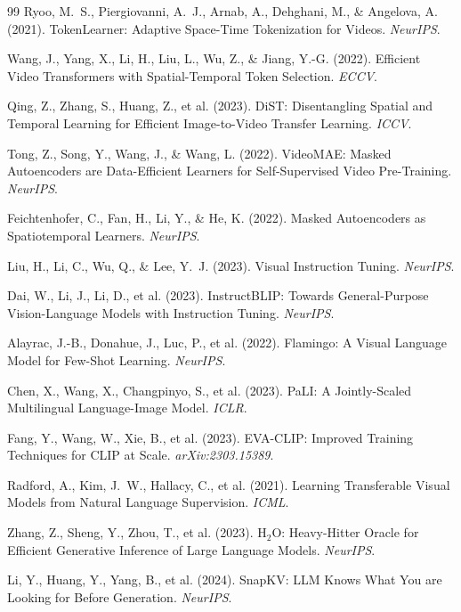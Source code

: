 \documentclass{article}
\begin{document}
{\begin{thebibliography}{99}
Ryoo, M.~S., Piergiovanni, A.~J., Arnab, A., Dehghani, M., \& Angelova, A. (2021). TokenLearner: Adaptive Space-Time Tokenization for Videos. \emph{NeurIPS}.

Wang, J., Yang, X., Li, H., Liu, L., Wu, Z., \& Jiang, Y.-G. (2022). Efficient Video Transformers with Spatial-Temporal Token Selection. \emph{ECCV}.

Qing, Z., Zhang, S., Huang, Z., et al. (2023). DiST: Disentangling Spatial and Temporal Learning for Efficient Image-to-Video Transfer Learning. \emph{ICCV}.

Tong, Z., Song, Y., Wang, J., \& Wang, L. (2022). VideoMAE: Masked Autoencoders are Data-Efficient Learners for Self-Supervised Video Pre-Training. \emph{NeurIPS}.

Feichtenhofer, C., Fan, H., Li, Y., \& He, K. (2022). Masked Autoencoders as Spatiotemporal Learners. \emph{NeurIPS}.

Liu, H., Li, C., Wu, Q., \& Lee, Y.~J. (2023). Visual Instruction Tuning. \emph{NeurIPS}.

Dai, W., Li, J., Li, D., et al. (2023). InstructBLIP: Towards General-Purpose Vision-Language Models with Instruction Tuning. \emph{NeurIPS}.

Alayrac, J.-B., Donahue, J., Luc, P., et al. (2022). Flamingo: A Visual Language Model for Few-Shot Learning. \emph{NeurIPS}.

Chen, X., Wang, X., Changpinyo, S., et al. (2023). PaLI: A Jointly-Scaled Multilingual Language-Image Model. \emph{ICLR}.

Fang, Y., Wang, W., Xie, B., et al. (2023). EVA-CLIP: Improved Training Techniques for CLIP at Scale. \emph{arXiv:2303.15389}.

Radford, A., Kim, J.~W., Hallacy, C., et al. (2021). Learning Transferable Visual Models from Natural Language Supervision. \emph{ICML}.

Zhang, Z., Sheng, Y., Zhou, T., et al. (2023). H$_2$O: Heavy-Hitter Oracle for Efficient Generative Inference of Large Language Models. \emph{NeurIPS}.

Li, Y., Huang, Y., Yang, B., et al. (2024). SnapKV: LLM Knows What You are Looking for Before Generation. \emph{NeurIPS}.


\end{thebibliography}}
\end{document}
